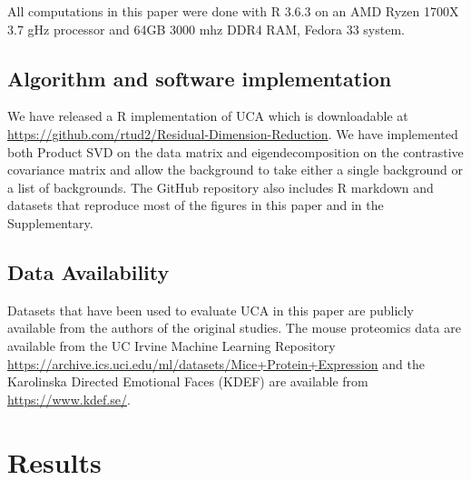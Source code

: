 \documentclass[12pt]{article}
\begin{document}

All computations in this paper were done with R 3.6.3 \cite{baseR} on an AMD Ryzen 1700X 3.7 gHz processor and 64GB 3000 mhz DDR4 RAM, Fedora 33 system. 


\subsection{Algorithm and software implementation}
We have released a R implementation of UCA which is downloadable at \url{https://github.com/rtud2/Residual-Dimension-Reduction}. We have implemented both Product SVD on the data matrix and eigendecomposition on the contrastive covariance matrix and allow the background to take either a single background or a list of backgrounds. The GitHub repository also includes R markdown and datasets that reproduce most of the figures in this paper and in the Supplementary.

\subsection{Data Availability}
Datasets that have been used to evaluate UCA in this paper are publicly available from the authors of the original studies. The mouse proteomics data are available from the UC Irvine Machine Learning Repository \url{https://archive.ics.uci.edu/ml/datasets/Mice+Protein+Expression} and the Karolinska Directed Emotional Faces (KDEF) are available from \url{https://www.kdef.se/}.

\section{Results\label{sec:results}}
\end{document}
